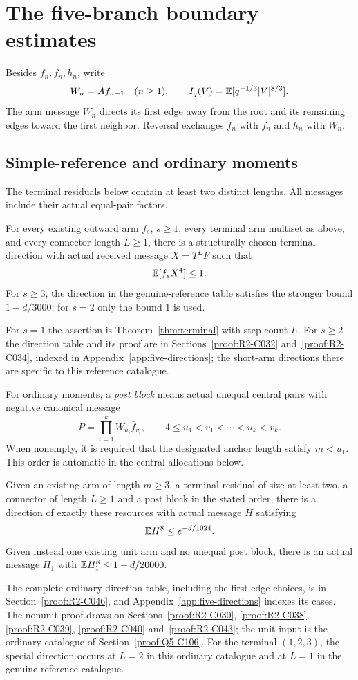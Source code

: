 \section{The five-branch boundary estimates}\label{sec:five-inputs}
Besides $f_n,\bar f_n,h_n$, write
\[
 W_n=A\bar f_{n-1}\quad(n\ge1),\qquad
 I_q(V)=\mathbb E[q^{-1/3}|V|^{8/3}].
\]
The arm message $W_n$ directs its first edge away from the root and
its remaining edges toward the first neighbor. Reversal exchanges
$f_n$ with $\bar f_n$ and $h_n$ with $W_n$.

\subsection{Simple-reference and ordinary moments}
The terminal residuals below contain at least two distinct lengths.
All messages include their actual equal-pair factors.
\begin{proposition}\label{prop:five-reference}
For every existing outward arm $f_s$, $s\ge1$, every terminal arm
multiset as above, and every connector length $L\ge1$, there is a
structurally chosen terminal direction with actual received message
$X=T^LF$ such that
\[
 \mathbb E[f_sX^4]\le1.
\]
For $s\ge3$, the direction in the genuine-reference table satisfies
the stronger bound $1-d/3000$; for $s=2$ only the bound $1$ is used.
\end{proposition}
For $s=1$ the assertion is Theorem~\ref{thm:terminal} with step count
$L$. For $s\ge2$ the direction table and its proof are in
Sections~\ref{proof:R2-C032} and~\ref{proof:R2-C034}, indexed in
Appendix~\ref{app:five-directions}; the short-arm directions there are
specific to this reference catalogue.

For ordinary moments, a \emph{post block} means actual unequal central
pairs with negative canonical message
\[
 P=\prod_{i=1}^k W_{u_i}\bar f_{v_i},\qquad
 4\le u_1<v_1<\cdots<u_k<v_k.
\]
When nonempty, it is required that the designated anchor length satisfy
$m<u_1$. This order is automatic in the central allocations below.
\begin{proposition}\label{prop:five-ordinary}
Given an existing arm of length $m\ge3$, a terminal residual of size at
least two, a connector of length $L\ge1$ and a post block in the stated
order, there is a direction of exactly these resources with actual
message $H$ satisfying
\[
 \mathbb E H^8\le e^{-d/1024}.
\]
Given instead one existing unit arm and no unequal post block, there
is an actual message $H_1$ with $\mathbb E H_1^8\le1-d/20000$.
\end{proposition}
The complete ordinary direction table, including the first-edge
choices, is in Section~\ref{proof:R2-C046}, and
Appendix~\ref{app:five-directions} indexes its cases. The nonunit proof
draws on Sections~\ref{proof:R2-C030}, \ref{proof:R2-C038},
\ref{proof:R2-C039}, \ref{proof:R2-C040} and~\ref{proof:R2-C043}; the
unit input is the ordinary catalogue of Section~\ref{proof:Q5-C106}.
For the terminal $(1,2,3)$, the special direction occurs at $L=2$ in this
ordinary catalogue and at $L=1$ in the genuine-reference catalogue.


